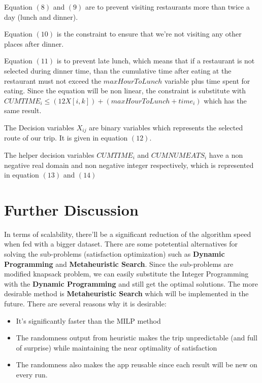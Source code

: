 \documentclass{article}
\begin{document}
\begin{itemize}
		Equation $(8)$ and $(9)$ are to prevent visiting restaurants more than twice a day (lunch and dinner).
		
		Equation $(10)$ is the constraint to ensure that we're not visiting any other places after dinner.
		
		Equation $(11)$ is to prevent late lunch, which means that if a restaurant is not selected during dinner time, than the cumulative time after eating at the restaurant must not exceed the $maxHourToLunch$ variable plus time spent for eating. Since the equation will be non linear, the constraint is substitute with $CUMTIME_{i} \le (12X[i, k]) + (maxHourToLunch + time_{i})$ which has the same result.
		
		The Decision variables $X_{ij}$ are binary variables which represents the selected route of our trip. It is given in equation $(12)$.
		
		The helper decision variables $CUMTIME_{i}$ and $CUMNUMEATS_{i}$ have a non negative real domain and non negative integer respectively, which is represented in equation $(13)$ and $(14)$
		
	\end{itemize}

	\section*{Further Discussion}

	In terms of scalability, there'll be a significant reduction of the algorithm speed when fed with a bigger dataset. There are some potetential alternatives for solving the sub-problems (satisfaction optimization) such as \textbf{Dynamic Programming} and \textbf{Metaheuristic Search}. Since the sub-problems are modified knapsack problem, we can easily substitute the Integer Programming with the \textbf{Dynamic Programming} and still get the optimal solutions. The more desirable method is \textbf{Metaheuristic Search} which will be implemented in the future. There are several reasons why it is desirable: 
	
	\begin{itemize}
		\item It's significantly faster than the MILP method
		\item The randomness output from heuristic makes the trip unpredictable (and full of surprise) while maintaining the near optimality of satisfaction
		\item The randomness also makes the app reusable since each result will be new on every run.
	\end{itemize}
	
\end{document}
